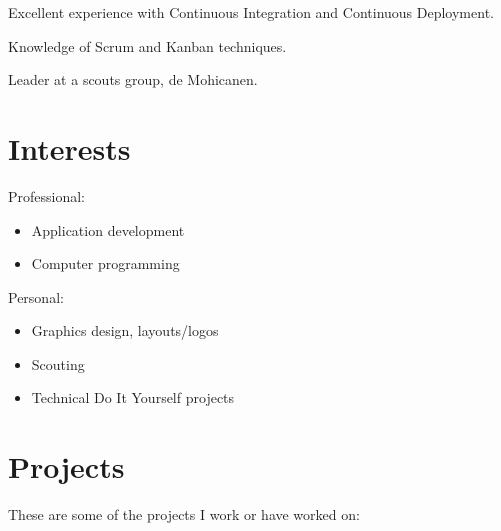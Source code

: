 \documentclass[]{friggeri-cv}
\providecommand{\tightlist}{%
\setlength{\itemsep}{0pt}\setlength{\parskip}{0pt}}
\begin{document}
Excellent experience with Continuous Integration and Continuous Deployment.

Knowledge of Scrum and Kanban techniques.

Leader at a scouts group, de Mohicanen.


\section{Interests}

Professional:
\begin{multicols}{2}
\begin{itemize}
  \tightlist{}
  \item Application development
  \item Computer programming
\end{itemize}
\end{multicols}


Personal:
\begin{multicols}{2}
\begin{itemize}
  \tightlist{}
  \item Graphics design, layouts/logos
  \item Scouting
  \item Technical Do It Yourself projects
\end{itemize}
\end{multicols}

\newpage{}


\section{Projects}

These are some of the projects I work or have worked on:
\end{document}
